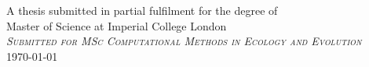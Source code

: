 \begin{titlepage}
    \vspace{1cm}
 
    {\large A thesis submitted in partial fulfilment for the degree of}\\[0.1cm]
    \large Master of Science at Imperial College London\\[0.1cm]
    \textsc{\large \emph{Submitted for MSc Computational Methods in Ecology and Evolution}}\\[0.2cm] %
    {\large \monthyeardate\today}\\ %
    
    
    \vfill %
	
\end{titlepage}